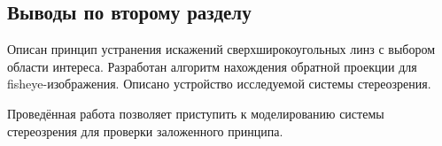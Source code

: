 \subsection{Выводы по второму разделу}

Описан принцип устранения искажений сверхширокоугольных линз с выбором области интереса. 
Разработан алгоритм нахождения обратной проекции для fisheye-изображения. 
Описано устройство исследуемой системы стереозрения. 

Проведённая работа позволяет приступить к моделированию системы стереозрения для проверки
заложенного принципа.  